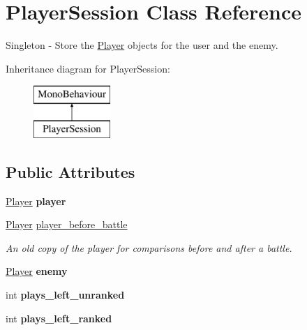 \hypertarget{class_player_session}{}\section{Player\+Session Class Reference}
\label{class_player_session}


Singleton -\/ Store the \mbox{\hyperlink{class_player}{Player}} objects for the user and the enemy.  


Inheritance diagram for Player\+Session\+:\begin{figure}[H]
\begin{center}
\leavevmode
\includegraphics[height=2.000000cm]{class_player_session}
\end{center}
\end{figure}
\subsection*{Public Attributes}
\begin{DoxyCompactItemize}
\item 
\mbox{\label{class_player_session_aca4d3def0c85712299f5528789df8110}} 
\mbox{\hyperlink{class_player}{Player}} {\bfseries player}
\item 
\mbox{\label{class_player_session_ab9a2cc0cdf6740f1dcbea0cef56c636b}} 
\mbox{\hyperlink{class_player}{Player}} \mbox{\hyperlink{class_player_session_ab9a2cc0cdf6740f1dcbea0cef56c636b}{player\+\_\+before\+\_\+battle}}
\begin{DoxyCompactList}\small\item\em An old copy of the player for comparisons before and after a battle. \end{DoxyCompactList}\item 
\mbox{\label{class_player_session_abef83de04d9672e0af2c9313ecde1dc1}} 
\mbox{\hyperlink{class_player}{Player}} {\bfseries enemy}
\item 
\mbox{\label{class_player_session_a0e78485525b4c9cedb9056ad65767d94}} 
int {\bfseries plays\+\_\+left\+\_\+unranked}
\item 
\mbox{\label{class_player_session_a297bef5c73fbe65dc70f914b066c7187}} 
int {\bfseries plays\+\_\+left\+\_\+ranked}
\end{DoxyCompactItemize}
